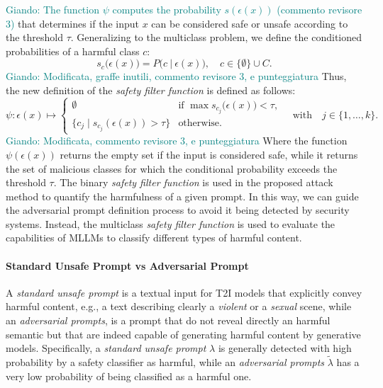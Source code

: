 \documentclass[acmsmall]{acmart}
\newcommand{\giando}[1]{\textcolor{teal}{Giando: #1}}
\begin{document}
\giando{The function $\psi$ computes the probability $s(\epsilon(x))$ (commento revisore 3)} that determines if the input $x$ can be considered safe or unsafe according to the threshold $\tau$. Generalizing to the multiclass problem, we define the conditioned probabilities of a harmful class $c$:
\begin{equation}\label{eq:multiclass_probability}
s_{c}\bigl(\epsilon(x)\bigr) = P\bigl(c~|~\epsilon(x)\bigr),
\quad
c \in \{\emptyset\} \cup C.
\end{equation}\giando{Modificata, graffe inutili, commento revisore 3, e punteggiatura}
Thus, the new definition of the \textit{safety filter function} is defined as follows:
\begin{equation}\label{eq:filter_function_multiclass}
\displaystyle
\psi: \epsilon(x)
\mapsto
\begin{cases}
\displaystyle
\emptyset 
& 
\text{if } 
\max 
s_{c_j}\bigl(\epsilon(x)\bigr) < \tau,\\
\{ c_j  \mid s_{c_j}(\epsilon(x)) > \tau \}
& 
\text{otherwise}.
\end{cases}
\quad\text{with}\quad j \in \{1, \dots, k\}. 
\end{equation}
\giando{Modificata, commento revisore 3, e punteggiatura}
\noindent
Where the function $\psi(\epsilon(x))$ returns the empty set if the input is considered safe, while it returns the set of malicious classes for which the conditional probability exceeds the threshold $\tau$.
The binary \textit{safety filter function} is used in the proposed attack method to quantify the harmfulness of a given prompt. In this way, we can guide the adversarial prompt definition process to avoid it being detected by security systems. Instead, the multiclass \textit{safety filter function} is used to evaluate the capabilities of MLLMs to classify different types of harmful content.
\vspace{-0.2cm}
\paragraph{Standard Unsafe Prompt vs Adversarial Prompt} A \textit{standard unsafe prompt} is a textual input for T2I models that explicitly convey harmful content, e.g., a text describing clearly a \textit{violent} or a \textit{sexual} scene, while an \textit{adversarial prompts}, is a prompt that do not reveal directly an harmful semantic but that are indeed capable of generating harmful content by generative models. Specifically, a \textit{standard unsafe prompt} $\lambda$ is generally detected with high probability by a safety classifier as harmful, while an \textit{adversarial prompts} $\tilde{\lambda}$ has a very low probability of being classified as a harmful one. 
\end{document}
